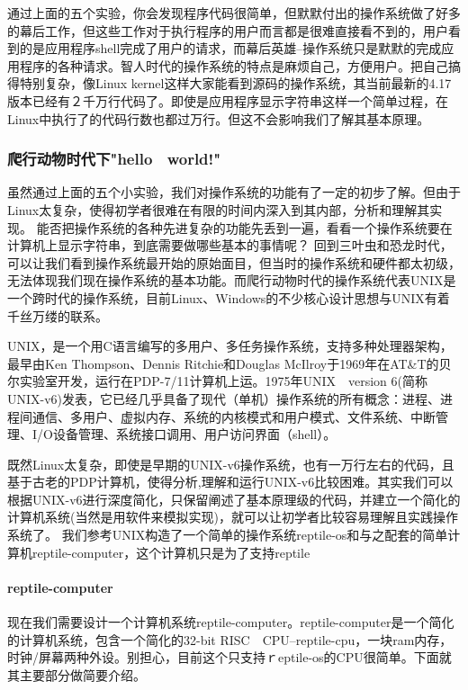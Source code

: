 通过上面的五个实验，你会发现程序代码很简单，但默默付出的操作系统做了好多的幕后工作，但这些工作对于执行程序的用户而言都是很难直接看不到的，用户看到的是应用程序shell完成了用户的请求，而幕后英雄--操作系统只是默默的完成应用程序的各种请求。智人时代的操作系统的特点是麻烦自己，方便用户。把自己搞得特别复杂，像Linux kernel这样大家能看到源码的操作系统，其当前最新的4.17版本已经有２千万行代码了。即使是应用程序显示字符串这样一个简单过程，在Linux中执行了的代码行数也都过万行。但这不会影响我们了解其基本原理。

\subsubsection{爬行动物时代下"hello　world!"}

虽然通过上面的五个小实验，我们对操作系统的功能有了一定的初步了解。但由于Linux太复杂，使得初学者很难在有限的时间内深入到其内部，分析和理解其实现。
能否把操作系统的各种先进复杂的功能先丢到一遍，看看一个操作系统要在计算机上显示字符串，到底需要做哪些基本的事情呢？
回到三叶虫和恐龙时代，可以让我们看到操作系统最开始的原始面目，但当时的操作系统和硬件都太初级，无法体现我们现在操作系统的基本功能。而爬行动物时代的操作系统代表UNIX是一个跨时代的操作系统，目前Linux、Windows的不少核心设计思想与UNIX有着千丝万缕的联系。

\begin{note} 
UNIX，是一个用C语言编写的多用户、多任务操作系统，支持多种处理器架构，最早由Ken Thompson、Dennis Ritchie和Douglas McIlroy于1969年在AT\&T的贝尔实验室开发，运行在PDP-7/11计算机上运。1975年UNIX　version 6(简称UNIX-v6)发表，它已经几乎具备了现代（单机）操作系统的所有概念：进程、进程间通信、多用户、虚拟内存、系统的内核模式和用户模式、文件系统、中断管理、I/O设备管理、系统接口调用、用户访问界面（shell）。
\end{note} 
	
既然Linux太复杂，即使是早期的UNIX-v6操作系统，也有一万行左右的代码，且基于古老的PDP计算机，使得分析,理解和运行UNIX-v6比较困难。其实我们可以根据UNIX-v6进行深度简化，只保留阐述了基本原理级的代码，并建立一个简化的计算机系统(当然是用软件来模拟实现)，就可以让初学者比较容易理解且实践操作系统了。
我们参考UNIX构造了一个简单的操作系统reptile-os和与之配套的简单计算机reptile-computer，这个计算机只是为了支持reptile
\paragraph{reptile-computer}
现在我们需要设计一个计算机系统reptile-computer。reptile-computer是一个简化的计算机系统，包含一个简化的32-bit RISC　CPU--reptile-cpu，一块ram内存，时钟/屏幕两种外设。别担心，目前这个只支持ｒeptile-os的CPU很简单。下面就其主要部分做简要介绍。

